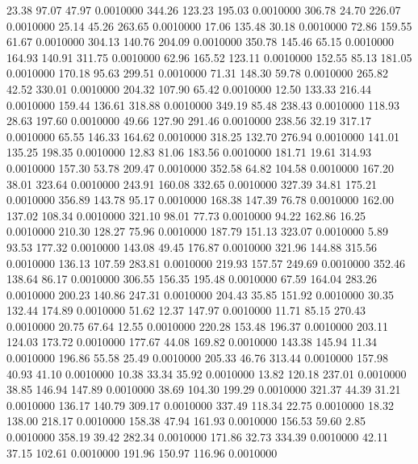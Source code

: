  23.38   97.07   47.97   0.0010000
 344.26  123.23  195.03   0.0010000
 306.78   24.70  226.07   0.0010000
  25.14   45.26  263.65   0.0010000
  17.06  135.48   30.18   0.0010000
  72.86  159.55   61.67   0.0010000
 304.13  140.76  204.09   0.0010000
 350.78  145.46   65.15   0.0010000
 164.93  140.91  311.75   0.0010000
  62.96  165.52  123.11   0.0010000
 152.55   85.13  181.05   0.0010000
 170.18   95.63  299.51   0.0010000
  71.31  148.30   59.78   0.0010000
 265.82   42.52  330.01   0.0010000
 204.32  107.90   65.42   0.0010000
  12.50  133.33  216.44   0.0010000
 159.44  136.61  318.88   0.0010000
 349.19   85.48  238.43   0.0010000
 118.93   28.63  197.60   0.0010000
  49.66  127.90  291.46   0.0010000
 238.56   32.19  317.17   0.0010000
  65.55  146.33  164.62   0.0010000
 318.25  132.70  276.94   0.0010000
 141.01  135.25  198.35   0.0010000
  12.83   81.06  183.56   0.0010000
 181.71   19.61  314.93   0.0010000
 157.30   53.78  209.47   0.0010000
 352.58   64.82  104.58   0.0010000
 167.20   38.01  323.64   0.0010000
 243.91  160.08  332.65   0.0010000
 327.39   34.81  175.21   0.0010000
 356.89  143.78   95.17   0.0010000
 168.38  147.39   76.78   0.0010000
 162.00  137.02  108.34   0.0010000
 321.10   98.01   77.73   0.0010000
  94.22  162.86   16.25   0.0010000
 210.30  128.27   75.96   0.0010000
 187.79  151.13  323.07   0.0010000
   5.89   93.53  177.32   0.0010000
 143.08   49.45  176.87   0.0010000
 321.96  144.88  315.56   0.0010000
 136.13  107.59  283.81   0.0010000
 219.93  157.57  249.69   0.0010000
 352.46  138.64   86.17   0.0010000
 306.55  156.35  195.48   0.0010000
  67.59  164.04  283.26   0.0010000
 200.23  140.86  247.31   0.0010000
 204.43   35.85  151.92   0.0010000
  30.35  132.44  174.89   0.0010000
  51.62   12.37  147.97   0.0010000
  11.71   85.15  270.43   0.0010000
  20.75   67.64   12.55   0.0010000
 220.28  153.48  196.37   0.0010000
 203.11  124.03  173.72   0.0010000
 177.67   44.08  169.82   0.0010000
 143.38  145.94   11.34   0.0010000
 196.86   55.58   25.49   0.0010000
 205.33   46.76  313.44   0.0010000
 157.98   40.93   41.10   0.0010000
  10.38   33.34   35.92   0.0010000
  13.82  120.18  237.01   0.0010000
  38.85  146.94  147.89   0.0010000
  38.69  104.30  199.29   0.0010000
 321.37   44.39   31.21   0.0010000
 136.17  140.79  309.17   0.0010000
 337.49  118.34   22.75   0.0010000
  18.32  138.00  218.17   0.0010000
 158.38   47.94  161.93   0.0010000
 156.53   59.60    2.85   0.0010000
 358.19   39.42  282.34   0.0010000
 171.86   32.73  334.39   0.0010000
  42.11   37.15  102.61   0.0010000
 191.96  150.97  116.96   0.0010000
